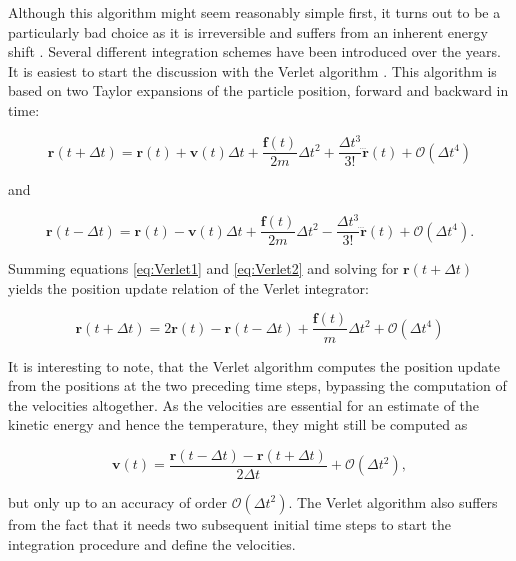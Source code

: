 \documentclass[english, a4paper, 12pt, titlepage, draft]{article}
\newcommand{\vect}[1]{\mathbf{#1}}
\newcommand{\fun}[2]{#1\left(#2\right)}
\newcommand{\vfun}[2]{\vect{#1}\left(#2\right)}
\begin{document}
\noindent
Although this algorithm might seem reasonably simple first, it turns out to be a particularly bad choice as it is irreversible and suffers from an inherent energy shift \cite{FrenkelSmit}.
Several different integration schemes have been introduced over the years.
It is easiest to start the discussion with the Verlet algorithm \cite{Verlet}.
This algorithm is based on two Taylor expansions of the particle position, forward and backward in time:

\begin{equation}
    \vfun{r}{t+\Delta t} = \vfun{r}{t} + \vfun{v}{t}\Delta t + \frac{\vfun{f}{t}}{2m} \Delta t^2 + \frac{\Delta t^3}{3!} \vfun{\dddot r}{t} + \fun{\mathcal{O}}{\Delta t^4}
    \label{eq:Verlet1}
\end{equation}

\noindent
and

\begin{equation}
    \vfun{r}{t-\Delta t} = \vfun{r}{t} - \vfun{v}{t}\Delta t + \frac{\vfun{f}{t}}{2m} \Delta t^2 - \frac{\Delta t^3}{3!} \vfun{\dddot r}{t} + \fun{\mathcal{O}}{\Delta t^4}.
    \label{eq:Verlet2}
\end{equation} 

\noindent
Summing equations \ref{eq:Verlet1} and \ref{eq:Verlet2} and solving for $\vfun{r}{t+\Delta t}$ yields the position update relation of the Verlet integrator:

\begin{equation}
    \vfun{r}{t+\Delta t} = 2\vfun{r}{t} - \vfun{r}{t-\Delta t} + \frac{\vfun{f}{t}}{m} \Delta t^2 + \mathcal{O}(\Delta t^4)
    \label{eq:VerletPos}
\end{equation}

\noindent
It is interesting to note, that the Verlet algorithm computes the position update from the positions at the two preceding time steps, bypassing the computation of the velocities altogether.
As the velocities are essential for an estimate of the kinetic energy and hence the temperature, they might still be computed as

\begin{equation}
    \vfun{v}{t} = \frac{\vfun{r}{t-\Delta t} - \vfun{r}{t+\Delta t}}{2\Delta t} + \mathcal{O}(\Delta t^2),
\end{equation}

\noindent
but only up to an accuracy of order $\mathcal{O}(\Delta t^2)$.
The Verlet algorithm also suffers from the fact that it needs two subsequent initial time steps to start the integration procedure and define the velocities.
\end{document}
